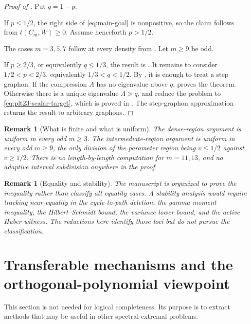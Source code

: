 ﻿\documentclass[11pt]{article}
\newtheorem{remark}[theorem]{Remark}
\numberwithin{equation}{section}
\begin{document}
\begin{proof}[Proof of ]
  Put $q=1-p$.

  If $p\le1/2$, the right side of \eqref{eq:main-goal} is nonpositive, so the claim follows from $t(C_m,W)\ge0$.
  Assume henceforth $p>1/2$.

  The cases $m=3,5,7$ follow at every density from .
  Let $m\ge9$ be odd.

  If $p\ge2/3$, or equivalently $q\le1/3$, the result is .
  It remains to consider $1/2<p<2/3$, equivalently $1/3<q<1/2$.
  By , it is enough to treat a step graphon.
  If the compression $A$ has no eigenvalue above $q$,  proves the theorem.
  Otherwise there is a unique eigenvalue $\Lambda>q$, and  reduce the problem to \eqref{eq:plt23-scalar-target}, which is proved in .
  The step-graphon approximation returns the result to arbitrary graphons.
\end{proof}

\begin{remark}[What is finite and what is uniform]
  The dense-region argument is uniform in every odd $m\ge3$.
  The intermediate-region argument is uniform in every odd $m\ge9$, the only division of the parameter region being $v\le1/2$ against $v\ge1/2$.
  There is no length-by-length computation for $m=11,13$, and no adaptive interval subdivision anywhere in the proof.
\end{remark}

\begin{remark}[Equality and stability]
  The manuscript is organized to prove the inequality rather than classify all equality cases.
  A stability analysis would require tracking near-equality in the cycle-to-path deletion, the gamma moment inequality, the Hilbert--Schmidt bound, the variance lower bound, and the active Huber witness.
  The reductions here identify those loci but do not pursue the classification.
\end{remark}

\section{Transferable mechanisms and the orthogonal-polynomial viewpoint}
\label{sec:transferable}

This section is not needed for logical completeness.
Its purpose is to extract methods that may be useful in other spectral extremal problems.
\end{document}
